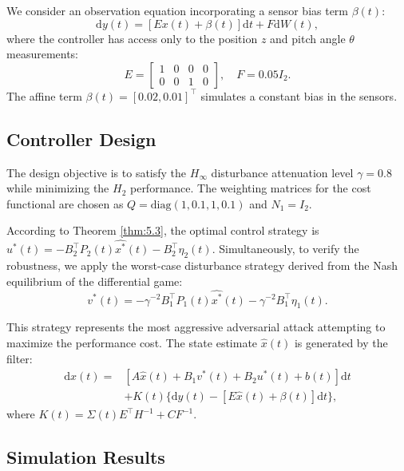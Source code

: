 \documentclass[lettersize,journal]{IEEEtran}
\theoremstyle{plain}
\theoremstyle{definition}
\begin{document}
We consider an observation equation incorporating a sensor bias term $\beta(t)$:
\begin{equation*}
	\mathrm{d}y(t) = [E x(t) + \beta(t)] \mathrm{d}t + F \mathrm{d}W(t),
\end{equation*}
where the controller has access only to the position $z$ and pitch angle $\theta$ measurements:
\begin{equation*}
	E = \begin{bmatrix} 
		1 & 0 & 0 & 0 \\
		0 & 0 & 1 & 0 
	\end{bmatrix}, \quad
	F = 0.05 I_2.
\end{equation*}
The affine term $\beta(t) = [0.02, 0.01]^\top$ simulates a constant bias in the sensors.

\subsection{Controller Design}

The design objective is to satisfy the $H_\infty$ disturbance attenuation level $\gamma = 0.8$ while minimizing the $H_2$ performance. The weighting matrices for the cost functional are chosen as $Q = \text{diag}(1, 0.1, 1, 0.1)$ and $N_1 = I_2$.

According to Theorem \ref{thm:5.3}, the optimal control strategy is $u^*(t) = -B_2^\top P_2(t) \widehat{x^*}(t) - B_2^{\top}\eta_2(t)$. Simultaneously, to verify the robustness, we apply the worst-case disturbance strategy derived from the Nash equilibrium of the differential game:
\begin{equation*}
	v^*(t) = -\gamma^{-2} B_1^\top P_1(t) \widehat{x^*}(t) - \gamma^{-2}B_1^{\top}\eta_1(t).
\end{equation*}

This strategy represents the most aggressive adversarial attack attempting to maximize the performance cost. The state estimate $\widehat{x}(t)$ is generated by the filter:
\begin{equation*}
	\begin{aligned}
		\mathrm{d}\widehat{x}(t) = &[A\widehat{x}(t) + B_1 v^*(t) + B_2 u^*(t) + b(t)]\mathrm{d}t \\
		&+ K(t)\{\mathrm{d}y(t) - [E\widehat{x}(t) + \beta(t)]\mathrm{d}t\},
	\end{aligned}
\end{equation*}
where $K(t) = \Sigma(t)E^{\top}H^{-1} + CF^{-1}$.

\subsection{Simulation Results}
\end{document}

